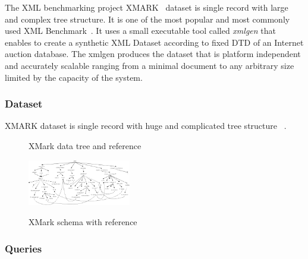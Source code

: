 The XML benchmarking project XMARK~\cite{xmark/original} dataset is single record with large and complex tree structure. It is one of the most popular and most commonly used XML Benchmark~\cite{xmark/mlynkova2008xml}. It uses a small executable tool called  \textit{xmlgen} that enables to create a synthetic XML Dataset according to fixed DTD of an Internet auction database. The xmlgen produces the dataset that is platform independent and accurately scalable ranging from a minimal document to any arbitrary size limited by the capacity of the system. 
\subsubsection{Dataset}
\label{xmark-dataset}
	XMARK dataset is single record with huge and complicated tree structure ~\cite{xmark/VIST}. 


\newpage
\begin{figure}
	\centering
	\centering
	\caption{XMark data tree and reference}
	\label{fig:xmark-tree-reference}
\end{figure}
\begin{figure}
	\centering
	\includegraphics[width=0.40\textwidth]{img/xmark-schema.png}
	\caption{XMark schema with reference}\cite{xmark/schema-sumerize}
	\label{fig:xmark-schema}
\end{figure}


\subsubsection{Queries}
\label{xmark-queries}

